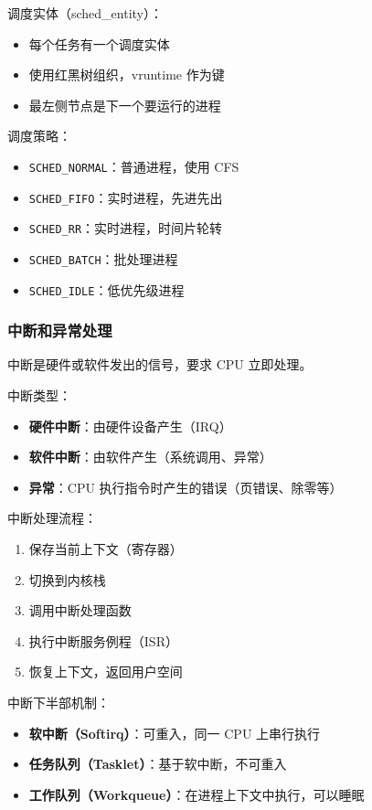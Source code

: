 调度实体（sched\_entity）：
\begin{itemize}
  \item 每个任务有一个调度实体
  \item 使用红黑树组织，vruntime 作为键
  \item 最左侧节点是下一个要运行的进程
\end{itemize}

调度策略：
\begin{itemize}
  \item \texttt{SCHED\_NORMAL}：普通进程，使用 CFS
  \item \texttt{SCHED\_FIFO}：实时进程，先进先出
  \item \texttt{SCHED\_RR}：实时进程，时间片轮转
  \item \texttt{SCHED\_BATCH}：批处理进程
  \item \texttt{SCHED\_IDLE}：低优先级进程
\end{itemize}

\subsubsection{中断和异常处理}

中断是硬件或软件发出的信号，要求 CPU 立即处理。

中断类型：
\begin{itemize}
  \item \textbf{硬件中断}：由硬件设备产生（IRQ）
  \item \textbf{软件中断}：由软件产生（系统调用、异常）
  \item \textbf{异常}：CPU 执行指令时产生的错误（页错误、除零等）
\end{itemize}

中断处理流程：
\begin{enumerate}
  \item 保存当前上下文（寄存器）
  \item 切换到内核栈
  \item 调用中断处理函数
  \item 执行中断服务例程（ISR）
  \item 恢复上下文，返回用户空间
\end{enumerate}

中断下半部机制：
\begin{itemize}
  \item \textbf{软中断（Softirq）}：可重入，同一 CPU 上串行执行
  \item \textbf{任务队列（Tasklet）}：基于软中断，不可重入
  \item \textbf{工作队列（Workqueue）}：在进程上下文中执行，可以睡眠
\end{itemize}

